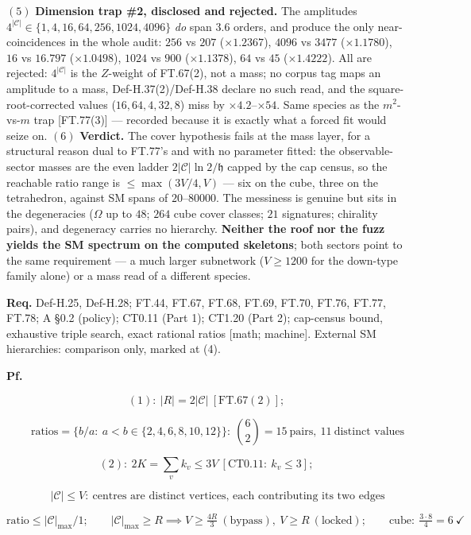 \begin{theorem}
$(5)$ \textbf{Dimension trap \#2, disclosed and rejected.} The amplitudes $4^{|\mathcal C|}\in\{1,4,16,64,256,1024,4096\}$ \textit{do} span $3.6$ orders, and produce the only near-coincidences in the whole audit: $256$ vs $207$ ($\times1.2367$), $4096$ vs $3477$ ($\times1.1780$), $16$ vs $16.797$ ($\times1.0498$), $1024$ vs $900$ ($\times1.1378$), $64$ vs $45$ ($\times1.4222$). All are rejected: $4^{|\mathcal C|}$ is the $Z$-weight of FT.67(2), not a mass; no corpus tag maps an amplitude to a mass, Def-H.37(2)/Def-H.38 declare no such read, and the square-root-corrected values ($16,64,4,32,8$) miss by $\times4.2$–$\times54$. Same species as the $m^2$-vs-$m$ trap [FT.77(3)] — recorded because it is exactly what a forced fit would seize on. $(6)$ \textbf{Verdict.} The cover hypothesis fails at the mass layer, for a structural reason dual to FT.77's and with no parameter fitted: the observable-sector masses are the even ladder $2|\mathcal C|\ln2/\mathfrak h$ capped by the cap census, so the reachable ratio range is $\le\max(3V/4,V)$ — six on the cube, three on the tetrahedron, against SM spans of $20$–$80000$. The messiness is genuine but sits in the degeneracies ($\Omega$ up to $48$; $264$ cube cover classes; $21$ signatures; chirality pairs), and degeneracy carries no hierarchy. \textbf{Neither the roof nor the fuzz yields the SM spectrum on the computed skeletons}; both sectors point to the same requirement — a much larger subnetwork ($V\ge1200$ for the down-type family alone) or a mass read of a different species.

\textbf{Req.} Def-H.25, Def-H.28; FT.44, FT.67, FT.68, FT.69, FT.70, FT.76, FT.77, FT.78; A §0.2 (policy); CT0.11 (Part 1); CT1.20 (Part 2); cap-census bound, exhaustive triple search, exact rational ratios [math; machine]. External SM hierarchies: comparison only, marked at (4).

\textbf{Pf.}

\[
(1):\ |R|=2|\mathcal C|\ [\mathrm{FT.67}(2)];
\]

\[
\qquad \text{ratios}=\{b/a:\ a<b\in\{2,4,6,8,10,12\}\}:\ \binom62=15\ \text{pairs},\ 11\ \text{distinct values}
\]

\[
(2):\ 2K=\textstyle\sum_vk_v\le3V\ [\mathrm{CT0.11}:\ k_v\le3];
\]

\[
\qquad |\mathcal C|\le V:\ \text{centres are distinct vertices, each contributing its two edges}
\]

\[
\text{ratio}\le|\mathcal C|_{\max}/1;\qquad|\mathcal C|_{\max}\ge R\implies V\ge\tfrac{4R}3\ (\text{bypass}),\ V\ge R\ (\text{locked});\qquad\text{cube}:\ \tfrac{3\cdot8}4=6\ \checkmark
\]


\end{theorem}
